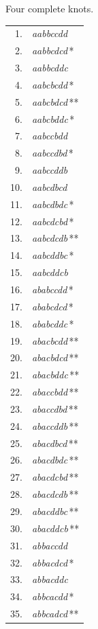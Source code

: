\clearpage{}
\begin{center}
Four complete knots.\par
\medskip
\begin{minipage}[t]{.31\linewidth}\centering
\begin{tabular}{r@{\ }l}
1. & \emph{aabbccdd} \\
2. & \emph{aabbcdcd}\,* \\
3. & \emph{aabbcddc} \\
4. & \emph{aabcbcdd}\,* \\
5. & \emph{aabcbdcd}\,** \\
6. & \emph{aabcbddc}\,* \\
7. & \emph{aabccbdd} \\
8. & \emph{aabccdbd}\,* \\
9. & \emph{aabccddb} \\
10. & \emph{aabcdbcd} \\
11. & \emph{aabcdbdc}\,* \\
12. & \emph{aabcdcbd}\,* \\
13. & \emph{aabcdcdb}\,** \\
14. & \emph{aabcddbc}\,* \\
15. & \emph{aabcddcb} \\
16. & \emph{ababccdd}\,* \\
17. & \emph{ababcdcd}\,* \\
18. & \emph{ababcddc}\,* \\
19. & \emph{abacbcdd}\,** \\
20. & \emph{abacbdcd}\,** \\
21. & \emph{abacbddc}\,** \\
22. & \emph{abaccbdd}\,** \\
23. & \emph{abaccdbd}\,** \\
24. & \emph{abaccddb}\,** \\
25. & \emph{abacdbcd}\,** \\
26. & \emph{abacdbdc}\,** \\
27. & \emph{abacdcbd}\,** \\
28. & \emph{abacdcdb}\,** \\
29. & \emph{abacddbc}\,** \\
30. & \emph{abacddcb}\,** \\
31. & \emph{abbaccdd} \\
32. & \emph{abbacdcd}\,* \\
33. & \emph{abbacddc} \\
34. & \emph{abbcacdd}\,* \\
35. & \emph{abbcadcd}\,** \\

\end{tabular}
\end{minipage}
\end{center}
